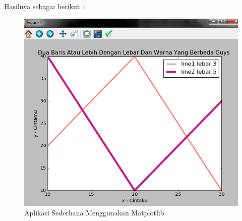 Hasilnya sebagai berikut :
\begin{figure}[ht]
\centering
\includegraphics[scale=0.3]{figures/praktek3.png}
\caption{Aplikasi Sederhana Menggunakan Matplotlib}
\label{Praktek}
\end{figure}
